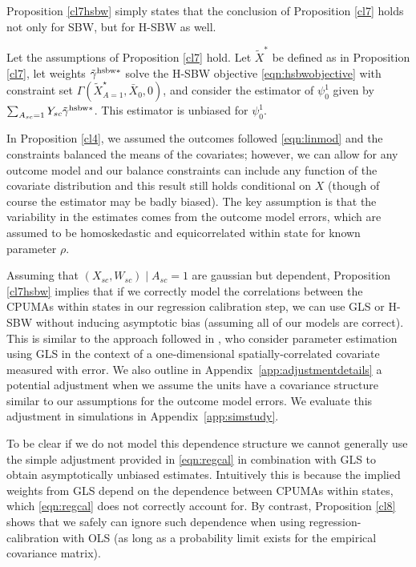 Proposition \ref{cl7hsbw} simply states that the conclusion of Proposition \ref{cl7} holds not only for SBW, but for H-SBW as well.

\begin{proposition}\label{cl7hsbw}
    Let the assumptions of Proposition \ref{cl7} hold. Let $\tilde{X}^*$ be defined as in Proposition \ref{cl7}, let weights $\tilde{\gamma}^{\textup{hsbw}*}$ solve the H-SBW objective \eqref{eqn:hsbwobjective} with constraint set $\Gamma(\tilde{X}^\star_{A=1}, \bar{X}_0, 0)$, and consider the estimator of $\psi_0^1$ given by $\sum_{A_{sc}=1} Y_{sc} \tilde{\gamma}^{\textup{hsbw}*}$. This estimator is unbiased for $\psi_0^1$.
\end{proposition}

\begin{remark}
    In Proposition \ref{cl4}, we assumed the outcomes followed \eqref{eqn:linmod} and the constraints balanced the means of the covariates; however, we can allow for any outcome model and our balance constraints can include any function of the covariate distribution and this result still holds conditional on $X$ (though of course the estimator may be badly biased). The key assumption is that the variability in the estimates comes from the outcome model errors, which are assumed to be homoskedastic and equicorrelated within state for known parameter $\rho$.
\end{remark}

\begin{remark}\label{remark:obgls}
    Assuming that $(X_{sc}, W_{sc}) \mid A_{sc} = 1$ are gaussian but dependent, Proposition \ref{cl7hsbw} implies that if we correctly model the correlations between the CPUMAs within states in our regression calibration step, we can use GLS or H-SBW without inducing asymptotic bias (assuming all of our models are correct). This is similar to the approach followed in \cite{huque2014impact}, who consider parameter estimation using GLS in the context of a one-dimensional spatially-correlated covariate measured with error. We also outline in Appendix~\ref{app:adjustmentdetails} a potential adjustment when we assume the units have a covariance structure similar to our assumptions for the outcome model errors. We evaluate this adjustment in simulations in Appendix~\ref{app:simstudy}. 
    
    To be clear if we do not model this dependence structure we cannot generally use the simple adjustment provided in \eqref{eqn:regcal} in combination with GLS to obtain asymptotically unbiased estimates. Intuitively this is because the implied weights from GLS depend on the dependence between CPUMAs within states, which \eqref{eqn:regcal} does not correctly account for. By contrast, Proposition \ref{cl8} shows that we safely can ignore such dependence when using regression-calibration with OLS (as long as a probability limit exists for the empirical covariance matrix).
\end{remark}

